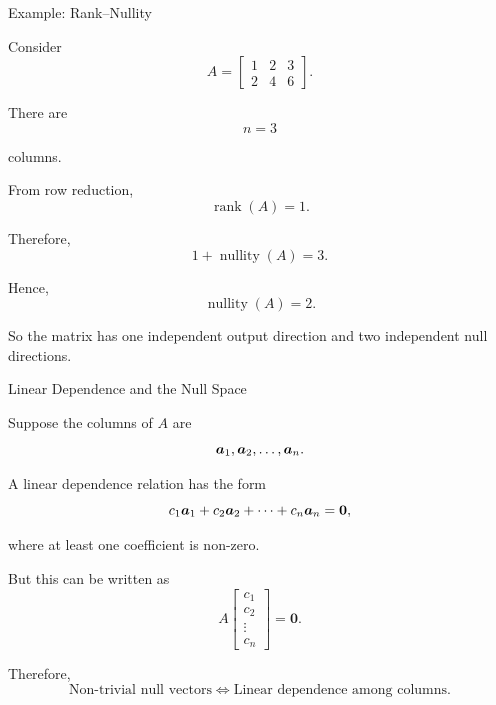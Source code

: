 \begin{frame}{Example: Rank--Nullity}

Consider
\vspace{-0.1cm}
\[
A=
\begin{bmatrix}
1&2&3\\
2&4&6
\end{bmatrix}.
\]

There are
\vspace{-0.1cm}
\[
n=3
\]

columns.

From row reduction,
\vspace{-0.1cm}
\[
\operatorname{rank}(A)=1.
\]

Therefore,
\vspace{-0.1cm}
\[
1+\operatorname{nullity}(A)=3.
\]

Hence,
\vspace{-0.1cm}
\[
\boxed{
\operatorname{nullity}(A)=2.
}
\]

So the matrix has one independent output direction and
two independent null directions.

\end{frame}



\begin{frame}{Linear Dependence and the Null Space}

Suppose the columns of $A$ are
\vspace{-0.1cm}
\[
\bm{a}_1,\bm{a}_2,\ldots,\bm{a}_n.
\]

A linear dependence relation has the form
\vspace{-0.1cm}
\[
c_1\bm{a}_1+
c_2\bm{a}_2+
\cdots+
c_n\bm{a}_n
=
\mathbf{0},
\]

where at least one coefficient is non-zero.

But this can be written as
\vspace{-0.1cm}
\[
A
\begin{bmatrix}
c_1\\
c_2\\
\vdots\\
c_n
\end{bmatrix}
=
\mathbf{0}.
\]

Therefore,
\vspace{-0.1cm}
\[
\boxed{
\text{Non-trivial null vectors}
\iff
\text{Linear dependence among columns}.
}
\]

\end{frame}


